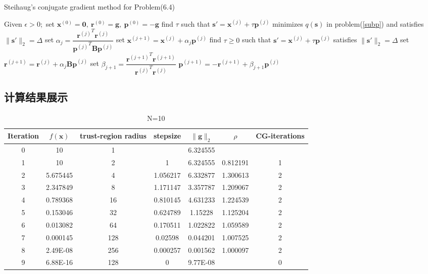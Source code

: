 \begin{algorithm}[H]  
\caption{Steihaug's conjugate gradient method for Problem(6.4)} 
\label{CG}  
\begin{algorithmic}[1]  
\STATE Given $\epsilon>0$;\ set $\bm{x}^{(0)}=\bm{0},\ \bm{r}^{(0)}=\bm{g},\ \bm{p}^{(0)}=-\bm{g}$
\ENDIF
{}
		\STATE find $\tau$ such that $\bm{s}'=\bm{x}^{(j)}+\tau\bm{p}^{(j)}$ minimizes $q(\bm{s})$ in problem(\ref{subp}) and satisfies $\|\bm{s}'\|_2=\Delta$
		\ENDIF	
		\STATE set $\alpha_j=\dfrac{{\bm{r}^{(j)}}^{T}{\bm{r}^{(j)}}}{{\bm{p}^{(j)}}^{T}\bm{B}{\bm{p}^{(j)}}}$
		\STATE set $\bm{x}^{(j+1)}=\bm{x}^{(j)}+\alpha_j\bm{p}^{(j)}$
		\STATE find $\tau\geq 0$ such that $\bm{s}'=\bm{x}^{(j)}+\tau\bm{p}^{(j)}$ satisfies $\|\bm{s}'\|_2=\Delta$
		\ENDIF
		\STATE set $\bm{r}^{(j+1)}=\bm{r}^{(j)}+\alpha_j\bm{Bp}^{(j)}$
		\ENDIF
		\STATE set $\beta_{j+1}=\dfrac{{\bm{r}^{(j+1)}}^{T}{\bm{r}^{(j+1)}}}{{\bm{r}^{(j)}}^{T}{\bm{r}^{(j)}}}$
		\STATE $\bm{p}^{(j+1)}=-\bm{r}^{(j+1)}+\beta_{j+1}\bm{p}^{(j)}$
\ENDFOR
\end{algorithmic}  
\end{algorithm}  


\newpage
\subsection{计算结果展示}
\begin{table}[htbp]
  \centering
  \caption{N=10}
    \begin{tabular}{ccccccc}
    \toprule
    Iteration&$f(\bm{x})$&trust-region radius&stepsize&$\|\bm{g}\|_2$&$\rho$&CG-iterations \\
    \midrule
    0     & 10    & 1     &       & 6.324555 &       &  \\
    1     & 10    & 2     & 1     & 6.324555 & 0.812191 & 1 \\
    2     & 5.675445 & 4     & 1.056217 & 6.332877 & 1.300613 & 2 \\
    3     & 2.347849 & 8     & 1.171147 & 3.357787 & 1.209067 & 2 \\
    4     & 0.789368 & 16    & 0.810145 & 4.631233 & 1.224539 & 2 \\
    5     & 0.153046 & 32    & 0.624789 & 1.15228 & 1.125204 & 2 \\
    6     & 0.013082 & 64    & 0.170511 & 1.022822 & 1.059589 & 2 \\
    7     & 0.000145 & 128   & 0.02598 & 0.044201 & 1.007525 & 2 \\
    8     & 2.49E-08 & 256   & 0.000257 & 0.001562 & 1.000097 & 2 \\
    9     & 6.88E-16 & 128   & 0     & 9.77E-08 &       & 0 \\
    \bottomrule
    \end{tabular}%
  \label{tab:addlabel}%
\end{table}%

